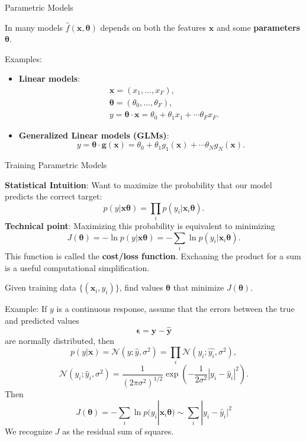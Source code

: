 \documentclass[12pt,t]{beamer}
\begin{document}
\begin{frame}{Parametric Models} 

In many models $ \hat{f}(\mathbf{x} , \bm{\theta})$ depends on both the features $\mathbf{x}$ and some {\bf parameters} $\bm{\theta}$.
\bigskip

Examples:
\begin{itemize}
\item {\bf Linear models}:
\begin{equation*} \begin{split}
& \mathbf{x} = (x_1, \ldots, x_F), \\
& \bm{\theta}  = (\theta_0, \ldots, \theta_F), \\
& y = \bm{\theta} \cdot \mathbf{x} = \theta_0 +  \theta_1 x_1 + \cdots  \theta_F x_F.
\end{split} \end{equation*}

\item {\bf Generalized Linear models (GLMs)}:
\begin{equation*}y = \bm{\theta} \cdot \bm{g}( \mathbf{x} )= \theta_0 +  \theta_1 g_1( \mathbf{x} ) + \cdots  \theta_N g_N( \mathbf{x} ).
 \end{equation*}
\end{itemize}

\end{frame}

\begin{frame}{Training Parametric Models}

{\bf Statistical Intuition}: Want to maximize the probability that our model predicts the correct target: 
$$p(y|\mathbf{x}\bm{\theta} ) = \prod_i p(y_i|\mathbf{x}_i\bm{\theta} ) .$$
{\bf Technical point}: Maximizing this probability is equivalent to minimizing
$$  J(\bm{\theta}) = - \ln p(y|\mathbf{x}\bm{\theta} )  = - \sum_i \ln p(y_i|\mathbf{x}_i\bm{\theta} ).$$
This function is called the  {\bf cost/loss function}.  Exchaning the product for a sum is a useful computational simplification.
\bigskip

Given training data $\{ (\mathbf{x}_i, y_i)\}$, find values $\bm{\theta}$ that minimize $J(\bm{\theta})$.

\end{frame}

\begin{frame}
Example: If $y$ is a continuous response, assume that the errors between the true and predicted values
$$ \mathbf{\epsilon} =\mathbf{ y} - \hat{\mathbf{y}} $$
are normally distributed, then 
$$ p(y | \mathbf{ x} ) = \mathcal{N}(y; \hat{y}, \sigma^2)= \prod_i  \mathcal{N}( y_i; \hat{ y_i}, \sigma^2),$$
$$  \mathcal{N}(y_i; \hat{y}_i, \sigma^2) 
	= \frac{1}{(2\pi \sigma^2)^{1/2}} \exp \left( - \frac{1}{2\sigma^2} |y_i - \hat{y}_i |^2 \right).$$
Then
$$J(\bm{\theta}) = - \sum_i \ln p(y_i|\mathbf{x}_i\bm{\theta} ) \sim  \sum_i  |y_i - \hat{y}_i |^2$$
We recognize $J$ as the residual sum of squares.
\end{frame}
\end{document}
